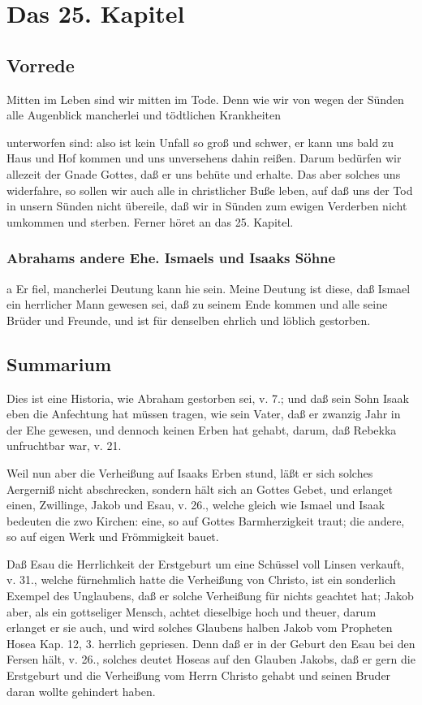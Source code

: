 \chapter{Das 25. Kapitel}

\section{Vorrede}

Mitten im Leben sind wir mitten im Tode. Denn wie wir von wegen der Sünden alle Augenblick mancherlei und tödtlichen Krankheiten

unterworfen sind: also ist kein Unfall so groß und schwer, er kann uns bald zu Haus und Hof kommen und uns unversehens dahin reißen. Darum bedürfen wir allezeit der Gnade Gottes, daß er uns behüte und erhalte. Das aber solches uns widerfahre, so sollen wir auch alle in christlicher Buße leben, auf daß uns der Tod in unsern Sünden nicht übereile, daß wir in Sünden zum ewigen Verderben nicht umkommen und sterben. Ferner höret an das 25. Kapitel.

\subsection{Abrahams andere Ehe. Ismaels und Isaaks Söhne}

a Er fiel, mancherlei Deutung kann hie sein. Meine Deutung ist diese, daß Ismael ein herrlicher Mann gewesen sei, daß zu seinem Ende kommen und alle seine Brüder und Freunde, und ist für denselben ehrlich und löblich gestorben.

\section{Summarium}

Dies ist eine Historia, wie Abraham gestorben sei, v. 7.; und daß sein Sohn Isaak eben die Anfechtung hat müssen tragen, wie sein Vater, daß er zwanzig Jahr in der Ehe gewesen, und dennoch keinen Erben hat gehabt, darum, daß Rebekka unfruchtbar war, v. 21.

Weil nun aber die Verheißung auf Isaaks Erben stund, läßt er sich solches Aergerniß nicht abschrecken, sondern hält sich an Gottes Gebet, und erlanget einen, Zwillinge, Jakob und Esau, v. 26., welche gleich wie Ismael und Isaak bedeuten die zwo Kirchen: eine, so auf Gottes Barmherzigkeit traut; die andere, so auf eigen Werk und Frömmigkeit bauet.

Daß Esau die Herrlichkeit der Erstgeburt um eine Schüssel voll Linsen verkauft, v. 31., welche fürnehmlich hatte die Verheißung von Christo, ist ein sonderlich Exempel des Unglaubens, daß er solche Verheißung für nichts geachtet hat; Jakob aber, als ein gottseliger Mensch, achtet dieselbige hoch und theuer, darum erlanget er sie auch, und wird solches Glaubens halben Jakob vom Propheten Hosea Kap. 12, 3. herrlich gepriesen. Denn daß er in der Geburt den Esau bei den Fersen hält, v. 26., solches deutet Hoseas auf den Glauben Jakobs, daß er gern die Erstgeburt und die Verheißung vom Herrn Christo gehabt und seinen Bruder daran wollte gehindert haben.

